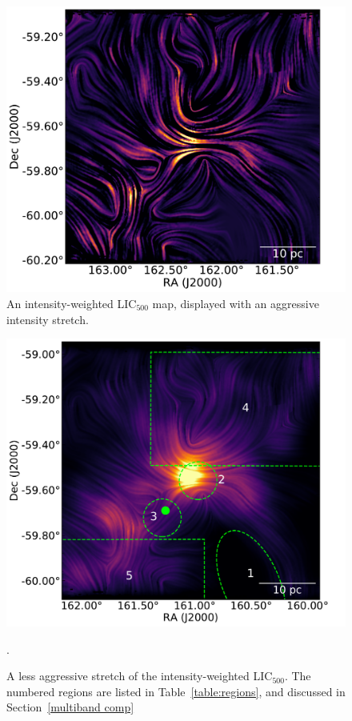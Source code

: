 \begin{figure}[!htbp]
\centering
\includegraphics[width=\textwidth]{figures/carina/lic2_han51}
\caption[~An intensity-weighted  map, displayed with an aggressive intensity stretch.]{An intensity-weighted LIC$_{500}$ map, displayed with an aggressive intensity stretch.}
\label{fig:lic2_han51}
\end{figure}

\begin{figure}[!htbp]
\centering
\includegraphics[width=\textwidth]{figures/carina/lic_mult}
\caption[~A less aggressive stretch of the intensity-weighted .]{A less aggressive stretch of the intensity-weighted LIC$_{500}$. The numbered regions are listed in Table~\ref{table:regions}, and discussed in Section~\ref{multiband comp}}.
\label{fig:lic_map}
\end{figure}

